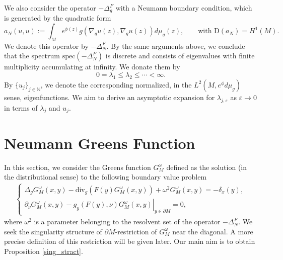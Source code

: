 \documentclass[12pt,a4paper]{amsart}
\numberwithin{equation}{section}
\theoremstyle{plain}
\theoremstyle{definition}
\begin{document}
	We also consider the operator $-\Delta_g^F$ with a Neumann boundary condition, which is generated by the quadratic form
	\begin{equation*}
		a_N(u,u) :=  \int_{M} e^{\phi(z)} g(\nabla_g u(z), \nabla_g u(z)) d\mu_g(z), \qquad \text{with } \mathrm{D}(a_N) = H^1(M).
	\end{equation*}
	We denote this operator by $-\Delta_N^F$. By the same arguments above, we conclude that the spectrum $\mathrm{spec}(-\Delta_N^F)$ is discrete and consists of eigenvalues with finite multiplicity accumulating at infinity. We  donate them by 
	\begin{equation*}
		0=\lambda_{1} \leq \lambda_{2}\leq \cdots < \infty.
	\end{equation*}
	By $\{u_{j}\}_{j\in \mathbb{N}}$, we denote the corresponding normalized, in the $L^2(M,e^\phi d\mu_g)$ sense, eigenfunctions. We aim to derive an asymptotic expansion for $\lambda_{j,\varepsilon}$ as $\varepsilon\rightarrow 0$ in terms of $\lambda_j$ and $u_j$.
	
	
	
	
	
	
	
	
	
	
	





\section{Neumann Greens Function}\label{Green_function_sec}
In this section, we consider the Greens function $G_M^\omega$ defined as the solution (in the distributional sense) to the following boundary value problem
\begin{align*}
		\begin{cases}
			\Delta_gG_M^\omega(x,y)-\text{div}_g(F(y)G_M^\omega(x,y))+\omega^2G_M^\omega(x,y) = -\delta_x(y), \\
			\left.\partial_\nu G_M^\omega(x,y) - g_y(F(y),\nu)G_M^\omega(x,y)\right\vert_{y\in \partial M} = 0,
		\end{cases}
\end{align*}
where $\omega^2$ is a parameter belonging to the resolvent set of the operator $-\Delta_N^F$. We seek the singularity structure of $\partial M$-restriction of $G_M^\omega$ near the diagonal. A more precise definition of this restriction will be given later. Our main aim is to obtain Proposition \ref{sing_stract}. 
\end{document}
